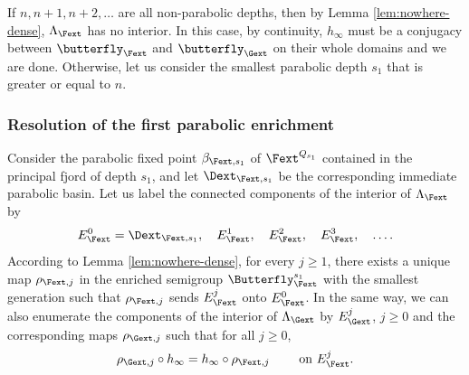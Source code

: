 \documentclass{amsart}
\begin{document}
If $n, n+1, n+2,\ldots$ are all non-parabolic depths, then by Lemma \ref{lem:nowhere-dense}, $\Lambda_{\Fext}$ has no interior. 
In this case, by continuity, $h_\infty$ must be a conjugacy between $\butterfly_{\Fext}$ and $\butterfly_{\Gext}$ on their whole domains and we are done. 
Otherwise, let us consider the smallest parabolic depth $s_1$ that is greater or equal to $n$.

\subsubsection{Resolution of the first parabolic enrichment}

Consider the parabolic fixed point $\beta_{\Fext,s_1}$ of $\Fext^{Q_{s_1}}$ contained in the principal fjord of depth $s_1$,
and let $\Dext_{\Fext,s_1}$ be the corresponding immediate parabolic basin.
Let us label the connected components of the interior of $\Lambda_{\Fext}$ by 
\[
    E^0_{\Fext} = \Dext_{\Fext,s_1}, \quad E^1_{\Fext}, \quad E^2_{\Fext}, \quad E^3_{\Fext}, \quad \ldots.
\]
According to Lemma \ref{lem:nowhere-dense}, for every $j \geq 1$, there exists a unique map $\rho_{\Fext,j}$ in the enriched semigroup $\Butterfly_{\Fext}^{s_1}$ with the smallest generation such that $\rho_{\Fext,j}$ sends $E^j_{\Fext}$ onto $E^0_{\Fext}$. 
In the same way, we can also enumerate the components of the interior of $\Lambda_{\Gext}$ by $E^j_{\Gext}$, $j \geq 0$ and the corresponding maps $\rho_{\Gext, j}$ such that for all $j \geq 0$, 
\[
    \rho_{\Gext,j} \circ h_\infty = h_\infty \circ \rho_{\Fext,j} \qquad \text{ on } E^j_{\Fext}.
\]
\end{document}
